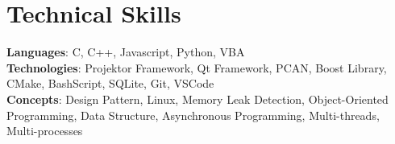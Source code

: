 \section{Technical Skills}
    \begin{itemize}[leftmargin=0.15in, label={}]
	\small{\item{
		\textbf{Languages}{: C, C++, Javascript, Python, VBA   } \\
		\textbf{Technologies}{: Projektor Framework, Qt Framework, PCAN, Boost Library, CMake, BashScript, SQLite, Git, VSCode } \\
		\textbf{Concepts}{: Design Pattern, Linux, Memory Leak Detection, Object-Oriented Programming, Data Structure, Asynchronous Programming, Multi-threads, Multi-processes }
	}}
    \end{itemize}